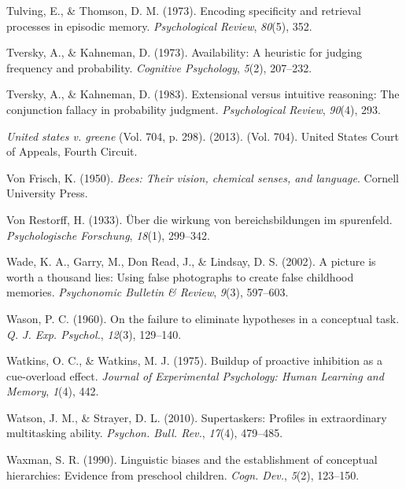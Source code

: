 \documentclass[
]{krantz}
\newlength{\cslhangindent}
\newenvironment{CSLReferences}[2] %
 {\begin{list}{}{%
  \setlength{\itemindent}{0pt}
  \setlength{\leftmargin}{0pt}
  \setlength{\parsep}{0pt}
  \ifodd #1
   \setlength{\leftmargin}{\cslhangindent}
   \setlength{\itemindent}{-1\cslhangindent}
  \fi
  \setlength{\itemsep}{#2\baselineskip}}}
 {\end{list}}
\begin{document}
\begin{CSLReferences}{1}{0}
Tulving, E., \& Thomson, D. M. (1973). Encoding specificity and retrieval processes in episodic memory. \emph{Psychological Review}, \emph{80}(5), 352.

Tversky, A., \& Kahneman, D. (1973). Availability: A heuristic for judging frequency and probability. \emph{Cognitive Psychology}, \emph{5}(2), 207--232.

Tversky, A., \& Kahneman, D. (1983). Extensional versus intuitive reasoning: The conjunction fallacy in probability judgment. \emph{Psychological Review}, \emph{90}(4), 293.

\emph{United states v. greene} (Vol. 704, p. 298). (2013). (Vol. 704). United States Court of Appeals, Fourth Circuit.

Von Frisch, K. (1950). \emph{Bees: Their vision, chemical senses, and language}. Cornell University Press.

Von Restorff, H. (1933). {Ü}ber die wirkung von bereichsbildungen im spurenfeld. \emph{Psychologische Forschung}, \emph{18}(1), 299--342.

Wade, K. A., Garry, M., Don Read, J., \& Lindsay, D. S. (2002). A picture is worth a thousand lies: Using false photographs to create false childhood memories. \emph{Psychonomic Bulletin \& Review}, \emph{9}(3), 597--603.

Wason, P. C. (1960). On the failure to eliminate hypotheses in a conceptual task. \emph{Q. J. Exp. Psychol.}, \emph{12}(3), 129--140.

Watkins, O. C., \& Watkins, M. J. (1975). Buildup of proactive inhibition as a cue-overload effect. \emph{Journal of Experimental Psychology: Human Learning and Memory}, \emph{1}(4), 442.

Watson, J. M., \& Strayer, D. L. (2010). Supertaskers: Profiles in extraordinary multitasking ability. \emph{Psychon. Bull. Rev.}, \emph{17}(4), 479--485.

Waxman, S. R. (1990). Linguistic biases and the establishment of conceptual hierarchies: Evidence from preschool children. \emph{Cogn. Dev.}, \emph{5}(2), 123--150.


\end{CSLReferences}
\end{document}
